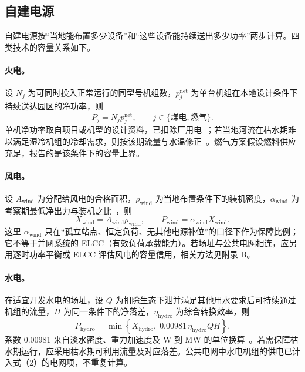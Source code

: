 \documentclass{mcmthesis}
\begin{document}
\subsection{自建电源}

自建电源按“当地能布置多少设备”和“这些设备能持续送出多少功率”两步计算。四类技术的容量关系如下。

\paragraph{火电。}
设 \(N_j\) 为可同时投入正常运行的同型号机组数，\(p_j^{\mathrm{net}}\) 为单台机组在本地设计条件下持续送达园区的净功率，则
\begin{equation}
P_j=N_jp_j^{\mathrm{net}},\qquad j\in\{\text{煤电},\text{燃气}\}.
\tag{3}
\end{equation}
单机净功率取自项目或机型的设计资料，已扣除厂用电~\cite{netl2025}；若当地河流在枯水期难以满足湿冷机组的冷却需求，则按该期流量与水温修正~\cite{jones2025}。燃气方案假设燃料供应充足，报告的是该条件下的容量上界。

\paragraph{风电。}
设 \(A_{\mathrm{wind}}\) 为分配给风电的合格面积，\(\rho_{\mathrm{wind}}\) 为当地布置条件下的装机密度，\(\alpha_{\mathrm{wind}}\) 为考察期最低净出力与装机之比~\cite{parzen2023,atlite2021}，则
\begin{equation}
X_{\mathrm{wind}}=A_{\mathrm{wind}}\rho_{\mathrm{wind}},\qquad
P_{\mathrm{wind}}=\alpha_{\mathrm{wind}}X_{\mathrm{wind}}.
\tag{4}
\end{equation}
这里 \(\alpha_{\mathrm{wind}}\) 只在“孤立站点、恒定负荷、无其他电源补位”的口径下作为保障比例；它不等于并网系统的 ELCC（有效负荷承载能力）。若场址与公共电网相连，应另用逐时功率平衡或 ELCC 评估风电的容量信用，相关方法见附录 B。

\paragraph{水电。}
在适宜开发水电的场址，设 \(Q\) 为扣除生态下泄并满足其他用水要求后可持续通过机组的流量，\(H\) 为同一条件下的净落差，\(\eta_{\mathrm{hydro}}\) 为综合转换效率，则
\begin{equation}
P_{\mathrm{hydro}}=\min\left\{X_{\mathrm{hydro}},\;0.00981\,\eta_{\mathrm{hydro}}QH\right\}.
\tag{5}
\end{equation}
系数 0.00981 来自淡水密度、重力加速度及 W 到 MW 的单位换算~\cite{doe1983}。若需保障枯水期运行，应采用枯水期可利用流量及对应落差。公共电网中水电机组的供电已计入式（2）的电网项，不重复计算。
\end{document}
